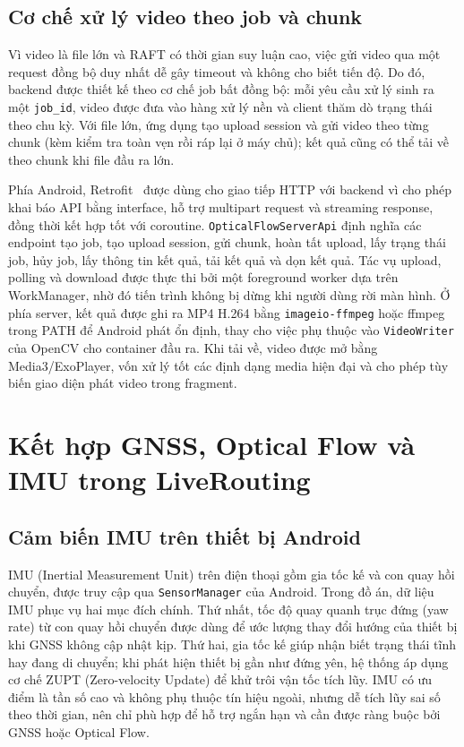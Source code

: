 \documentclass[../DoAn.tex]{subfiles}
\begin{document}
\subsection{Cơ chế xử lý video theo job và chunk}
\label{subsection:3.5.4}
Vì video là file lớn và RAFT có thời gian suy luận cao, việc gửi video qua một request đồng bộ duy nhất dễ gây timeout và không cho biết tiến độ. Do đó, backend được thiết kế theo cơ chế job bất đồng bộ: mỗi yêu cầu xử lý sinh ra một \texttt{job\_id}, video được đưa vào hàng xử lý nền và client thăm dò trạng thái theo chu kỳ. Với file lớn, ứng dụng tạo upload session và gửi video theo từng chunk (kèm kiểm tra toàn vẹn rồi ráp lại ở máy chủ); kết quả cũng có thể tải về theo chunk khi file đầu ra lớn.

Phía Android, Retrofit~\cite{retrofit-docs} được dùng cho giao tiếp HTTP với backend vì cho phép khai báo API bằng interface, hỗ trợ multipart request và streaming response, đồng thời kết hợp tốt với coroutine. \texttt{OpticalFlowServerApi} định nghĩa các endpoint tạo job, tạo upload session, gửi chunk, hoàn tất upload, lấy trạng thái job, hủy job, lấy thông tin kết quả, tải kết quả và dọn kết quả. Tác vụ upload, polling và download được thực thi bởi một foreground worker dựa trên WorkManager, nhờ đó tiến trình không bị dừng khi người dùng rời màn hình. Ở phía server, kết quả được ghi ra MP4 H.264 bằng \texttt{imageio-ffmpeg} hoặc ffmpeg trong PATH để Android phát ổn định, thay cho việc phụ thuộc vào \texttt{VideoWriter} của OpenCV cho container đầu ra. Khi tải về, video được mở bằng Media3/ExoPlayer, vốn xử lý tốt các định dạng media hiện đại và cho phép tùy biến giao diện phát video trong fragment.

\section{Kết hợp GNSS, Optical Flow và IMU trong LiveRouting}
\label{section:3.6}
\subsection{Cảm biến IMU trên thiết bị Android}
\label{subsection:3.6.1}
IMU (Inertial Measurement Unit) trên điện thoại gồm gia tốc kế và con quay hồi chuyển, được truy cập qua \texttt{SensorManager} của Android. Trong đồ án, dữ liệu IMU phục vụ hai mục đích chính. Thứ nhất, tốc độ quay quanh trục đứng (yaw rate) từ con quay hồi chuyển được dùng để ước lượng thay đổi hướng của thiết bị khi GNSS không cập nhật kịp. Thứ hai, gia tốc kế giúp nhận biết trạng thái tĩnh hay đang di chuyển; khi phát hiện thiết bị gần như đứng yên, hệ thống áp dụng cơ chế ZUPT (Zero-velocity Update) để khử trôi vận tốc tích lũy. IMU có ưu điểm là tần số cao và không phụ thuộc tín hiệu ngoài, nhưng dễ tích lũy sai số theo thời gian, nên chỉ phù hợp để hỗ trợ ngắn hạn và cần được ràng buộc bởi GNSS hoặc Optical Flow.
\end{document}
